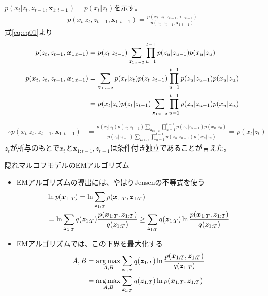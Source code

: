 \documentclass[aspectratio=169,unicode,dvipdfmx,14pt]{beamer}
\begin{document}
\begin{frame}{}
\FontMath
$p(x_t|z_t,z_{t-1},\bm{x}_{1:t-1}) = p(x_t|z_t)$を示す。
\begin{align}
p(x_t|z_t,z_{t-1},\bm{x}_{1:t-1})
= \frac{p(x_t,z_t,z_{t-1},\bm{x}_{1:t-1})}{p(z_t,z_{t-1},\bm{x}_{1:t-1})}
\end{align}
\vspace{-.1in}
式\eqref{eq:eq01}より
\begin{align}
p(z_t,z_{t-1},\bm{x}_{1:t-1}) 
& = p(z_t|z_{t-1}) \sum_{\bm{z}_{1:t-2}} \prod_{u=1}^{t-1} p(z_u|z_{u-1})p(x_u|z_u) \notag
\\
p(x_t, z_t,z_{t-1},\bm{x}_{1:t-1}) 
& = \sum_{\bm{z}_{1:t-2}}  p(x_t|z_t) p(z_t|z_{t-1}) \prod_{u=1}^{t-1} p(z_u|z_{u-1})p(x_u|z_u)
\notag \\ & = p(x_t|z_t) p(z_t|z_{t-1}) \sum_{\bm{z}_{1:t-2}} \prod_{u=1}^{t-1} p(z_u|z_{u-1})p(x_u|z_u)
\end{align}
\vspace{-.1in}
\begin{align}
\therefore
p(x_t|z_t,z_{t-1},\bm{x}_{1:t-1})
& = \frac{p(x_t|z_t) p(z_t|z_{t-1}) \sum_{\bm{z}_{1:t-2}} \prod_{u=1}^{t-1} p(z_u|z_{u-1})p(x_u|z_u)
}{p(z_t|z_{t-1}) \sum_{\bm{z}_{1:t-2}} \prod_{u=1}^{t-1} p(z_u|z_{u-1})p(x_u|z_u)
}
=p(x_t|z_t)
\end{align}
$z_t$が所与のもとで$x_t$と$\bm{x}_{1:t-1},z_{t-1}$は条件付き独立であることが言えた。
\end{frame}

\begin{frame}{隠れマルコフモデルのEMアルゴリズム}
\begin{itemize}
\item EMアルゴリズムの導出には、やはりJensenの不等式を使う
\vspace{-.1in}
\begin{align}
& \ln p(\bm{x}_{1:T}) = \ln \sum_{\bm{z}_{1:T}} p(\bm{x}_{1:T}, \bm{z}_{1:T})
\notag \\ &
= \ln \sum_{\bm{z}_{1:T}} q(\bm{z}_{1:T}) \frac{ p(\bm{x}_{1:T}, \bm{z}_{1:T}) }{ q(\bm{z}_{1:T}) }
\geq \sum_{\bm{z}_{1:T}} q(\bm{z}_{1:T}) \ln \frac{ p(\bm{x}_{1:T}, \bm{z}_{1:T}) }{ q(\bm{z}_{1:T}) }
\end{align}
\vspace{-.5in}
\item EMアルゴリズムでは、この下界を最大化する
\begin{align}
A,B & = \operatorname*{arg\,max}_{A,B} \sum_{\bm{z}_{1:T}} q(\bm{z}_{1:T}) \ln \frac{ p(\bm{x}_{1:T}, \bm{z}_{1:T}) }{ q(\bm{z}_{1:T}) }
\notag \\ &
= \operatorname*{arg\,max}_{A,B} \sum_{\bm{z}_{1:T}} q(\bm{z}_{1:T}) \ln p(\bm{x}_{1:T}, \bm{z}_{1:T})
\end{align}
\end{itemize}
\end{frame}
\end{document}
